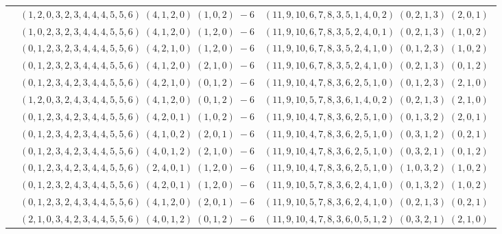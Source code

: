 \documentclass[11pt]{article}
\begin{document}
\begin{longtable}[l]{|c|c|c|}
 \cline{2-3} 
 & $(1 ,2 ,0 ,3 ,2 ,3 ,4 ,4 ,4 ,5 ,5 ,6) \;(4 ,1 ,2 ,0) \;(1 ,0 ,2) \;-6$ & $(11 ,9 ,10 ,6 ,7 ,8 ,3 ,5 ,1 ,4 ,0 ,2) \;(0 ,2 ,1 ,3) \;(2 ,0 ,1) \;$\\ 
 \cline{2-3} 
 & $(1 ,0 ,2 ,3 ,2 ,3 ,4 ,4 ,4 ,5 ,5 ,6) \;(4 ,1 ,2 ,0) \;(1 ,2 ,0) \;-6$ & $(11 ,9 ,10 ,6 ,7 ,8 ,3 ,5 ,2 ,4 ,0 ,1) \;(0 ,2 ,1 ,3) \;(1 ,0 ,2) \;$\\ 
 \cline{2-3} 
 & $(0 ,1 ,2 ,3 ,2 ,3 ,4 ,4 ,4 ,5 ,5 ,6) \;(4 ,2 ,1 ,0) \;(1 ,2 ,0) \;-6$ & $(11 ,9 ,10 ,6 ,7 ,8 ,3 ,5 ,2 ,4 ,1 ,0) \;(0 ,1 ,2 ,3) \;(1 ,0 ,2) \;$\\ 
 \cline{2-3} 
 & $(0 ,1 ,2 ,3 ,2 ,3 ,4 ,4 ,4 ,5 ,5 ,6) \;(4 ,1 ,2 ,0) \;(2 ,1 ,0) \;-6$ & $(11 ,9 ,10 ,6 ,7 ,8 ,3 ,5 ,2 ,4 ,1 ,0) \;(0 ,2 ,1 ,3) \;(0 ,1 ,2) \;$\\ 
 \cline{2-3} 
 & $(0 ,1 ,2 ,3 ,4 ,2 ,3 ,4 ,4 ,5 ,5 ,6) \;(4 ,2 ,1 ,0) \;(0 ,1 ,2) \;-6$ & $(11 ,9 ,10 ,4 ,7 ,8 ,3 ,6 ,2 ,5 ,1 ,0) \;(0 ,1 ,2 ,3) \;(2 ,1 ,0) \;$\\ 
 \cline{2-3} 
 & $(1 ,2 ,0 ,3 ,2 ,4 ,3 ,4 ,4 ,5 ,5 ,6) \;(4 ,1 ,2 ,0) \;(0 ,1 ,2) \;-6$ & $(11 ,9 ,10 ,5 ,7 ,8 ,3 ,6 ,1 ,4 ,0 ,2) \;(0 ,2 ,1 ,3) \;(2 ,1 ,0) \;$\\ 
 \cline{2-3} 
 & $(0 ,1 ,2 ,3 ,4 ,2 ,3 ,4 ,4 ,5 ,5 ,6) \;(4 ,2 ,0 ,1) \;(1 ,0 ,2) \;-6$ & $(11 ,9 ,10 ,4 ,7 ,8 ,3 ,6 ,2 ,5 ,1 ,0) \;(0 ,1 ,3 ,2) \;(2 ,0 ,1) \;$\\ 
 \cline{2-3} 
 & $(0 ,1 ,2 ,3 ,4 ,2 ,3 ,4 ,4 ,5 ,5 ,6) \;(4 ,1 ,0 ,2) \;(2 ,0 ,1) \;-6$ & $(11 ,9 ,10 ,4 ,7 ,8 ,3 ,6 ,2 ,5 ,1 ,0) \;(0 ,3 ,1 ,2) \;(0 ,2 ,1) \;$\\ 
 \cline{2-3} 
 & $(0 ,1 ,2 ,3 ,4 ,2 ,3 ,4 ,4 ,5 ,5 ,6) \;(4 ,0 ,1 ,2) \;(2 ,1 ,0) \;-6$ & $(11 ,9 ,10 ,4 ,7 ,8 ,3 ,6 ,2 ,5 ,1 ,0) \;(0 ,3 ,2 ,1) \;(0 ,1 ,2) \;$\\ 
 \cline{2-3} 
 & $(0 ,1 ,2 ,3 ,4 ,2 ,3 ,4 ,4 ,5 ,5 ,6) \;(2 ,4 ,0 ,1) \;(1 ,2 ,0) \;-6$ & $(11 ,9 ,10 ,4 ,7 ,8 ,3 ,6 ,2 ,5 ,1 ,0) \;(1 ,0 ,3 ,2) \;(1 ,0 ,2) \;$\\ 
 \cline{2-3} 
 & $(0 ,1 ,2 ,3 ,2 ,4 ,3 ,4 ,4 ,5 ,5 ,6) \;(4 ,2 ,0 ,1) \;(1 ,2 ,0) \;-6$ & $(11 ,9 ,10 ,5 ,7 ,8 ,3 ,6 ,2 ,4 ,1 ,0) \;(0 ,1 ,3 ,2) \;(1 ,0 ,2) \;$\\ 
 \cline{2-3} 
 & $(0 ,1 ,2 ,3 ,2 ,4 ,3 ,4 ,4 ,5 ,5 ,6) \;(4 ,1 ,2 ,0) \;(2 ,0 ,1) \;-6$ & $(11 ,9 ,10 ,5 ,7 ,8 ,3 ,6 ,2 ,4 ,1 ,0) \;(0 ,2 ,1 ,3) \;(0 ,2 ,1) \;$\\ 
 \cline{2-3} 
 & $(2 ,1 ,0 ,3 ,4 ,2 ,3 ,4 ,4 ,5 ,5 ,6) \;(4 ,0 ,1 ,2) \;(0 ,1 ,2) \;-6$ & $(11 ,9 ,10 ,4 ,7 ,8 ,3 ,6 ,0 ,5 ,1 ,2) \;(0 ,3 ,2 ,1) \;(2 ,1 ,0) \;$\\ 

\end{longtable}
\end{document}

